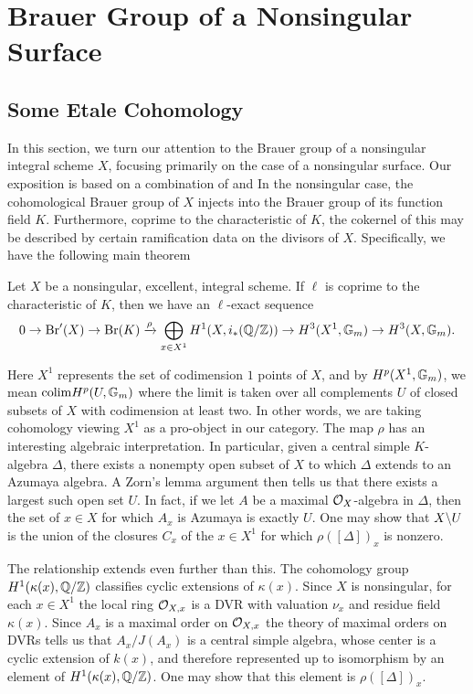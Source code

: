 \section{Brauer Group of a Nonsingular Surface}
\subsection{Some Etale Cohomology}
In this section, we turn our attention to the Brauer group of a nonsingular integral scheme $X$, focusing primarily on the case of a nonsingular surface.  Our exposition is based on a combination of \cite{artin1972some} and \cite{Artin&deJong} In the nonsingular case, the cohomological Brauer group of $X$ injects into the Brauer group of its function field $K$.  Furthermore, coprime to the characteristic of $K$, the cokernel of this may be described by certain ramification data on the divisors of $X$.  Specifically, we have the following main theorem
\begin{thm}
Let $X$ be a nonsingular, excellent, integral scheme.  If $\ell$ is coprime to the characteristic of $K$, then we have an $\ell$-exact sequence
$$0\rightarrow \textnormal{Br}'(X)\rightarrow\textnormal{Br}(K)\xrightarrow{\rho} \bigoplus_{x\in X^1} H^1(X,i_*(\mathbb{Q}/\mathbb{Z}))\rightarrow H^3(X^1,\mathbb{G}_m)\rightarrow H^3(X,\mathbb{G}_m).$$
\end{thm}
Here $X^1$ represents the set of codimension $1$ points of $X$, and by $H^p(X^1,\mathbb{G}_m)$, we mean $\textnormal{colim} H^p(U,\mathbb{G}_m)$ where the limit is taken over all complements $U$ of closed subsets of $X$ with codimension at least two.  In other words, we are taking cohomology viewing $X^1$ as a pro-object in our category.  The map $\rho$ has an interesting algebraic interpretation.  In particular, given a central simple $K$-algebra $\Delta$, there exists a nonempty open subset of $X$ to which $\Delta$ extends to an Azumaya algebra.  A Zorn's lemma argument then tells us that there exists a largest such open set $U$.  In fact, if we let $A$ be a maximal $\mathcal{O}_X$-algebra in $\Delta$, then the set of $x\in X$ for which $A_x$ is Azumaya is exactly $U$.  One may show that $X\backslash U$ is the union of the closures $C_x$ of the $x\in X^1$ for which $\rho([\Delta])_x$ is nonzero.

The relationship extends even further than this.  The cohomology group $H^1(\kappa(x),\mathbb{Q}/\mathbb{Z})$ classifies cyclic extensions of $\kappa(x)$.  Since $X$ is nonsingular, for each $x\in X^1$ the local ring $\mathcal{O}_{X,x}$ is a DVR with valuation $\nu_x$ and residue field $\kappa(x)$.  Since $A_x$ is a maximal order on $\mathcal{O}_{X,x}$ the theory of maximal orders on DVRs tells us that $A_x/J(A_x)$ is a central simple algebra, whose center is a cyclic extension of $k(x)$, and therefore represented up to isomorphism by an element of $H^1(\kappa(x),\mathbb{Q}/\mathbb{Z})$.  One may show that this element is $\rho([\Delta])_x$.

